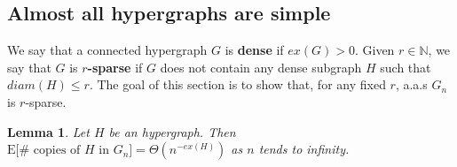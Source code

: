 \documentclass[12pt,notitlepage,a4paper]{article}
\newtheorem{lemma}{Lemma}[section]
\theoremstyle{definition}
\newcommand{\N}{\mathbb{N}}
\begin{document}
\subsection{Almost all hypergraphs are simple}


We say that a connected hypergraph $G$ is \textbf{dense} if
$ex(G)>0$. Given $r\in \N$, we say that $G$ is \textbf{$r$-sparse}
if $G$ does not contain any dense subgraph $H$ such that 
$diam(H)\leq r$. The goal of this section is to show that, for any
fixed $r$, a.a.s $G_n$ is $r$-sparse.\par

\begin{lemma}
	Let $H$ be an hypergraph. Then 
	$\mathrm{E}\big[\# \text{ copies of }H \text{ in } G_n\big]=
	\Theta(n^{-ex(H)})$ as $n$ tends to infinity.  
\end{lemma}
\end{document}
